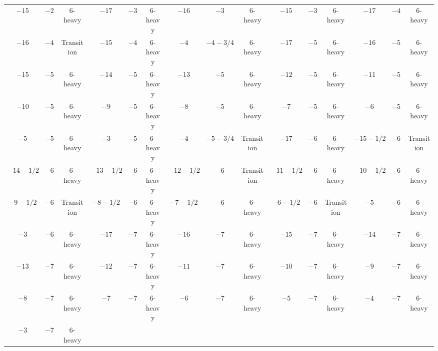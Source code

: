 \begin{table}[!bht]
{\begin{tabular}{@{}ccccccccccccccc@{}}
$-15$ & $-2$ & \multicolumn{1}{c|}{$6$-heavy} & $-17$ & $-3$ & \multicolumn{1}{c|}{$6$-heavy} & $-16$ & $-3$ & \multicolumn{1}{c|}{$6$-heavy} & $-15$ & $-3$ & \multicolumn{1}{c|}{$6$-heavy} & $-17$ & $-4$ & $6$-heavy \\
$-16$ & $-4$ & \multicolumn{1}{c|}{Transition} & $-15$ & $-4$ & \multicolumn{1}{c|}{$6$-heavy} & $-4$ & $-4-3/4$ & \multicolumn{1}{c|}{$6$-heavy} & $-17$ & $-5$ & \multicolumn{1}{c|}{$6$-heavy} & $-16$ & $-5$ & $6$-heavy \\
$-15$ & $-5$ & \multicolumn{1}{c|}{$6$-heavy} & $-14$ & $-5$ & \multicolumn{1}{c|}{$6$-heavy} & $-13$ & $-5$ & \multicolumn{1}{c|}{$6$-heavy} & $-12$ & $-5$ & \multicolumn{1}{c|}{$6$-heavy} & $-11$ & $-5$ & $6$-heavy \\
$-10$ & $-5$ & \multicolumn{1}{c|}{$6$-heavy} & $-9$ & $-5$ & \multicolumn{1}{c|}{$6$-heavy} & $-8$ & $-5$ & \multicolumn{1}{c|}{$6$-heavy} & $-7$ & $-5$ & \multicolumn{1}{c|}{$6$-heavy} & $-6$ & $-5$ & $6$-heavy \\
$-5$ & $-5$ & \multicolumn{1}{c|}{$6$-heavy} & $-3$ & $-5$ & \multicolumn{1}{c|}{$6$-heavy} & $-4$ & $-5-3/4$ & \multicolumn{1}{c|}{Transition} & $-17$ & $-6$ & \multicolumn{1}{c|}{$6$-heavy} & $-15-1/2$ & $-6$ & Transition \\
$-14-1/2$ & $-6$ & \multicolumn{1}{c|}{$6$-heavy} & $-13-1/2$ & $-6$ & \multicolumn{1}{c|}{$6$-heavy} & $-12-1/2$ & $-6$ & \multicolumn{1}{c|}{Transition} & $-11-1/2$ & $-6$ & \multicolumn{1}{c|}{$6$-heavy} & $-10-1/2$ & $-6$ & $6$-heavy \\
$-9-1/2$ & $-6$ & \multicolumn{1}{c|}{Transition} & $-8-1/2$ & $-6$ & \multicolumn{1}{c|}{$6$-heavy} & $-7-1/2$ & $-6$ & \multicolumn{1}{c|}{$6$-heavy} & $-6-1/2$ & $-6$ & \multicolumn{1}{c|}{Transition} & $-5$ & $-6$ & $6$-heavy \\
$-3$ & $-6$ & \multicolumn{1}{c|}{$6$-heavy} & $-17$ & $-7$ & \multicolumn{1}{c|}{$6$-heavy} & $-16$ & $-7$ & \multicolumn{1}{c|}{$6$-heavy} & $-15$ & $-7$ & \multicolumn{1}{c|}{$6$-heavy} & $-14$ & $-7$ & $6$-heavy \\
$-13$ & $-7$ & \multicolumn{1}{c|}{$6$-heavy} & $-12$ & $-7$ & \multicolumn{1}{c|}{$6$-heavy} & $-11$ & $-7$ & \multicolumn{1}{c|}{$6$-heavy} & $-10$ & $-7$ & \multicolumn{1}{c|}{$6$-heavy} & $-9$ & $-7$ & $6$-heavy \\
$-8$ & $-7$ & \multicolumn{1}{c|}{$6$-heavy} & $-7$ & $-7$ & \multicolumn{1}{c|}{$6$-heavy} & $-6$ & $-7$ & \multicolumn{1}{c|}{$6$-heavy} & $-5$ & $-7$ & \multicolumn{1}{c|}{$6$-heavy} & $-4$ & $-7$ & $6$-heavy \\
$-3$ & $-7$ & \multicolumn{1}{c|}{$6$-heavy} &  &  & \multicolumn{1}{c|}{} &  &  & \multicolumn{1}{c|}{} &  &  & \multicolumn{1}{c|}{} &  &  & \\\bottomrule
\end{tabular}%
}
\end{table}

